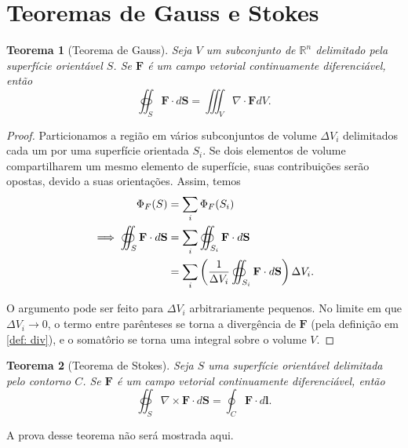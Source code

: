 \section{Teoremas de Gauss e Stokes}

\renewcommand{\proofname}{Prova}
\newtheorem{theorem}{Teorema}

\begin{theorem}[Teorema de Gauss]
Seja $V$ um subconjunto de $\mathbb{R}^n$ delimitado pela superfície orientável $S$. Se $\mathbf F$ é um campo vetorial continuamente diferenciável, então 
\begin{equation}
\oiint_S \mathbf{F} \cdot d\mathbf{S} = \iiint_V \nabla \cdot \mathbf{F} dV.
\label{th: div}
\end{equation}

\end{theorem}

\begin{proof}
Particionamos a região em vários subconjuntos de volume $\Delta V_i$ delimitados cada um por uma superfície orientada $S_i$. Se dois elementos de volume compartilharem um mesmo elemento de superfície, suas contribuições serão opostas, devido a suas orientações. Assim, temos 
\begin{align}
\Phi_F(S) &= \sum_i \Phi_F(S_i) \notag \\
\implies \oiint_{S} \mathbf{F} \cdot d\mathbf{S} &= \sum_i \oiint_{S_i} \mathbf{F} \cdot d\mathbf{S} \notag \\
&= \sum_i \left( \frac{1}{\Delta V_i} \oiint_{S_i} \mathbf{F} \cdot d\mathbf{S} \right) \Delta V_i.
\end{align}

\noindent O argumento pode ser feito para $\Delta V_i$ arbitrariamente pequenos. No limite em que $\Delta V_i \to 0$, o termo entre parênteses se torna a divergência de $\mathbf{F}$ (pela definição em \ref{def: div}), e o somatôrio se torna uma integral sobre o volume $V$.
\end{proof}

\begin{theorem}[Teorema de Stokes]
Seja $S$ uma superfície orientável delimitada pelo contorno $C$. Se $\mathbf{F}$ é um campo vetorial continuamente diferenciável, então
\begin{equation}
\oiint_S \nabla \times \mathbf{F} \cdot d\mathbf{S} = \oint_C \mathbf{F} \cdot d\mathbf{l}.
\label{th: stokes}
\end{equation}
\end{theorem}
A prova desse teorema não será mostrada aqui.
